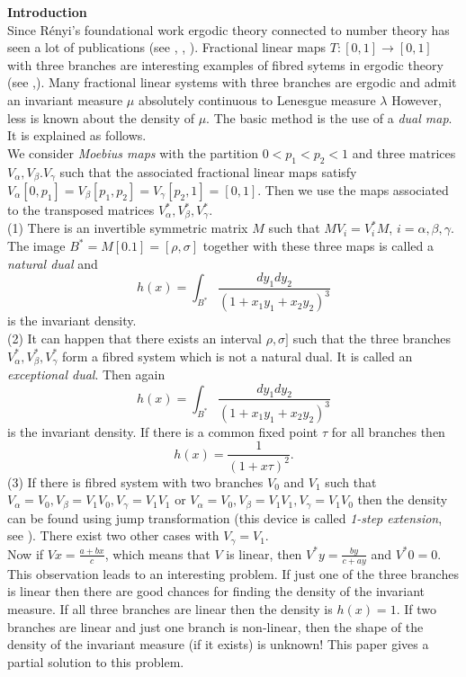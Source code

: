 \documentclass[12pt]{article}
\begin{document}
	{\bf Introduction}\\
	Since Rényi's foundational work \cite{R} ergodic theory connected to number theory has seen a lot of publications (see  \cite{Sch95}, \cite{IoKr}, \cite{Sch16}).  
	Fractional linear maps  $T: [0,1] \to [0,1]$
	with three branches are interesting examples of fibred sytems in ergodic theory (see \cite{Sch06},\cite{Sch18}). Many fractional linear systems with three branches are ergodic and admit an invariant measure  $\mu$ absolutely continuous to Lenesgue measure $	\lambda$ However, less is known about the density of $\mu$. The basic method is the use of a {\em dual map}. It is explained as follows.\\
	We consider {\em Moebius maps} with the partition $0 < p_1 < p_2 < 1$ and three matrices $V_{\alpha}, V_{\beta}. V_\gamma$ such that the associated fractional linear maps satisfy $V_\alpha[0,p_1] = V_\beta[p_1, p_2] = V_\gamma [p_2,1] = [0,1]$. Then we use the maps associated to the transposed matrices  $V_{\alpha}^{*}, V_{\beta}^{*}, V_{\gamma}^{*}$. \\
	(1)  There is an invertible symmetric matrix $M$ such that $M V_i = V_i^{*}M$, $i = \alpha, \beta,  \gamma$. The image $B^{*} = M[0.1] =[\rho, \sigma]$ together with these three maps is called a {\em natural dual} and 
$$  h(x)= \int_{B^{*}} \frac{dy_1 dy_2 }{(1+ x_1 y_1 + x_2 y_2)^3} $$ is the invariant density. \\
(2) It can happen that there exists an interval $\rho, \sigma]$ such that the three branches $V_{\alpha}^{*}, V_{\beta}^{*}, V_{\gamma}^{*} $  form a fibred system which is not a natural dual. It is called an {\em exceptional dual}. Then again 
$$  h(x)= \int_{B^{*}} \frac{dy_1 dy_2 }{(1+ x_1 y_1 + x_2 y_2)^3} $$ is the invariant density. If there is a common fixed point $\tau$ for all branches then 
$$ h(x)= \frac{1}{(1+ x \tau)^2}.$$
(3)	If there is fibred system with two branches $V_0$ and $V_1$ such that $V_\alpha = V_0, V_\beta = V_1 V_0
, V_\gamma = V_1 V_1$ or $V_\alpha = V_0, V_\beta = V_1 V_1, V_\gamma = V_1V_0$ then the density can be found using  jump transformation (this device is called {\em 1-step extension}, see \cite{Sch25}). There exist two other cases with $V_\gamma = V_1$. \\
Now if $Vx = \frac{a+bx}{c}$, which means that $V$ is linear, then  $V^{*}y = \frac {by}{c+ay}$  and $V^{*}0 = 0$. This observation leads to an interesting problem. If just one of the three branches is linear then there are good chances for finding the density of the invariant measure. If all three branches are linear then the density is $h(x) =1$. If two branches are linear and just one branch is non-linear, then the shape of the density of the invariant measure (if it exists) is unknown! This paper gives a partial solution  to this problem. \\
\end{document}
